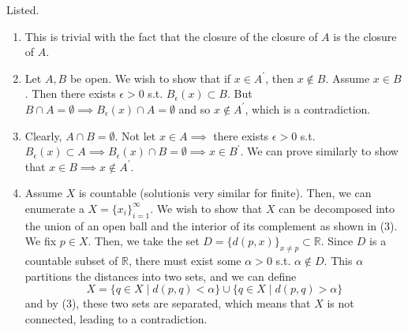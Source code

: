   \begin{solution}
    Listed. 
    \begin{enumerate}
        \item This is trivial with the fact that the closure of the closure of $A$ is the closure of $A$. 
        \item Let $A, B$ be open. We wish to show that if $x \in A^\prime$, then $x \not\in B$. Assume $x \in B$. Then there exists $\epsilon > 0$ s.t. $B_\epsilon (x) \subset B$. But $B \cap A = \emptyset \implies B_\epsilon (x) \cap A = \emptyset$ and so $x \not\in A^\prime$, which is a contradiction. 

        \item Clearly, $A \cap B = \emptyset$. Not let $x \in A \implies$ there exists $\epsilon > 0$ s.t. $B_\epsilon (x) \subset A \implies B_\epsilon (x) \cap B = \emptyset \implies x \in B^\prime$. We can prove similarly to show that $x \in B \implies x \not\in A^\prime$. 

        \item Assume $X$ is countable (solutionis very similar for finite). Then, we can enumerate a $X = \{x_i\}_{i=1}^\infty$. We wish to show that $X$ can be decomposed into the union of an open ball and the interior of its complement as shown in (3). We fix $p \in X$. Then, we take the set $D = \{d(p, x)\}_{x \neq p} \subset \mathbb{R}$. Since $D$ is a countable subset of $\mathbb{R}$, there must exist some $\alpha > 0$ s.t. $\alpha \not\in D$. This $\alpha$ partitions the distances into two sets, and we can define 
        \[X = \{q \in X \mid d(p, q) < \alpha\} \cup \{q \in X \mid d(p, q) > \alpha\}\]
        and by (3), these two sets are separated, which means that $X$ is not connected, leading to a contradiction. 
    \end{enumerate}
  \end{solution}

